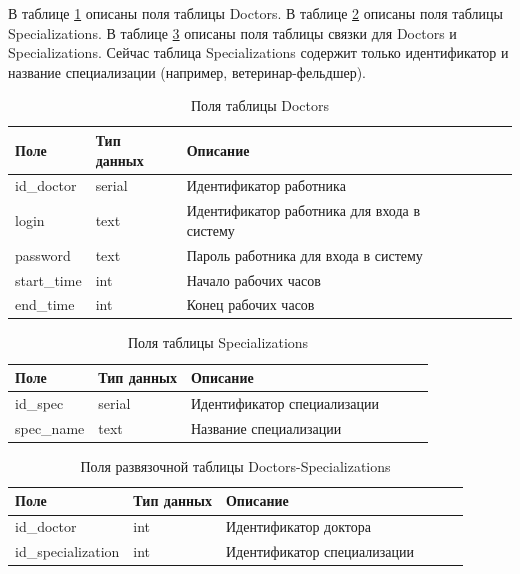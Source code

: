 В таблице \ref{tab:doctors}  описаны поля таблицы Doctors. В таблице \ref{tab:specializations} описаны поля таблицы Specializations. В таблице \ref{tab:DC} описаны поля таблицы связки для Doctors и Specializations. Сейчас таблица Specializations содержит только идентификатор и название специализации (например, ветеринар-фельдшер).
\begin{table}[hbtp]
	\begin{center}
			\caption{\label{tab:doctors}Поля таблицы Doctors}
		\begin{tabular}{|l|l|l|l|l|l|}
			\hline {Поле} & {Тип данных} & {Описание}  \\ \hline
			id\_doctor  & serial & Идентификатор работника   \\ \hline
			login & text & Идентификатор работника для входа в систему \\ \hline
			password & text & Пароль работника для входа в систему  \\ \hline
			start\_time & int & Начало рабочих часов\\ \hline
			end\_time & int & Конец рабочих часов\\ \hline
		\end{tabular}
	\end{center}
\end{table}

\begin{table}[hbtp]
	\begin{center}
		\caption{\label{tab:specializations}Поля таблицы Specializations}
		\begin{tabular}{|l|l|l|l|l|l|}
			\hline {Поле} & {Тип данных} & {Описание}  \\ \hline
			id\_spec  & serial & Идентификатор специализации \\ \hline
			spec\_name & text & Название специализации\\ \hline
		\end{tabular}
	\end{center}
\end{table}

\begin{table}[hbtp]
	\begin{center}
		\caption{\label{tab:DC}Поля развязочной таблицы Doctors-Specializations}
		\begin{tabular}{|l|l|l|l|l|l|}
			\hline {Поле} & {Тип данных} & {Описание}  \\ \hline
			id\_doctor  & int & Идентификатор доктора \\ \hline
			id\_specialization & int & Идентификатор специализации \\ \hline
		\end{tabular}
	\end{center}
\end{table}

